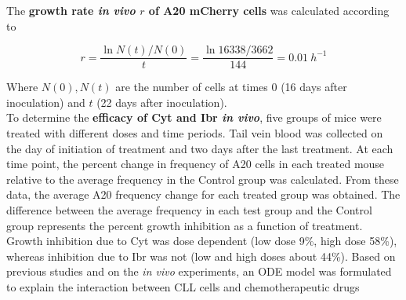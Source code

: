 The \textbf{growth rate \textit{in vivo} $r$ of A20 mCherry cells} was calculated according to

\[ r = \frac{\ln{N(t)/N(0)}}{t} = \frac{\ln{16338/3662}}{144} = 0.01\ h^{-1} \]

Where $N(0), N(t)$ are the number of cells at times $0$ (16 days after inoculation) and $t$ (22 days after inoculation).\\
To determine the \textbf{efficacy of Cyt and Ibr \textit{in vivo}}, five groups of mice were treated with different doses and time periods. Tail vein blood was collected on the day of initiation of treatment and two days after the last treatment. 
At each time point, the percent change in frequency of A20 cells in each treated mouse relative to the average frequency in the Control group was calculated. From these data, the average A20 frequency change for each treated group was obtained. 
The difference between the average frequency in each test group and the Control group represents the percent growth inhibition as a function of treatment. Growth inhibition due to Cyt was dose dependent (low dose 9\%, high dose 58\%), whereas inhibition due to Ibr was not (low and high doses about 44\%).
Based on previous studies and on the \textit{in vivo} experiments, an ODE model was formulated to explain the interaction between CLL cells and chemotherapeutic drugs

